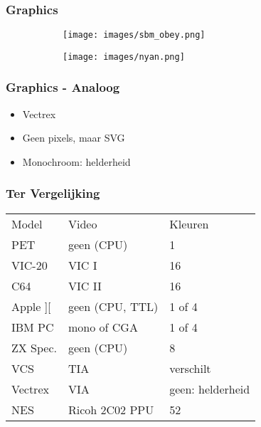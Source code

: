 \begin{frame}
\frametitle[fragile]{Graphics}

\begin{figure}
	\begin{subfigure}[b]{0.4\textwidth}
		\texttt{[image: images/sbm\_obey.png]}
	\end{subfigure}
	\begin{subfigure}[b]{0.5\textwidth}
		\texttt{[image: images/nyan.png]}
	\end{subfigure}
\end{figure}

\end{frame}


\begin{frame}
\frametitle{Graphics - Analoog}

\begin{itemize}
\item Vectrex
\item Geen pixels, maar SVG
\item Monochroom: helderheid
\end{itemize}

\end{frame}


\begin{frame}
\frametitle{Ter Vergelijking}

\begin{tabular}{|l|l|l|}
\hline Model & Video & Kleuren \\
PET & geen (CPU) & 1 \\
VIC-20 & VIC I & 16 \\
C64 & VIC II & 16 \\
Apple ][ & geen (CPU, TTL) & 1 of 4 \\
IBM PC & mono of CGA & 1 of 4 \\
ZX Spec. & geen (CPU) & 8 \\ \hline
VCS & TIA & verschilt \\
Vectrex & VIA & geen: helderheid \\
NES & Ricoh 2C02 PPU & 52 \\ \hline
\end{tabular}

\end{frame}



